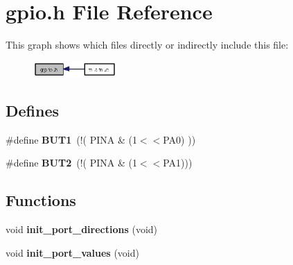 \section{gpio.h File Reference}
\label{gpio_8h}


This graph shows which files directly or indirectly include this file:\begin{figure}[H]
\begin{center}
\leavevmode
\includegraphics[width=90pt]{gpio_8h__dep__incl}
\end{center}
\end{figure}
\subsection*{Defines}
\begin{CompactItemize}
\item 
\#define {\bf BUT1}~(!( PINA \& (1$<$$<$PA0) ))
\item 
\#define {\bf BUT2}~(!( PINA \& (1$<$$<$PA1)))
\end{CompactItemize}
\subsection*{Functions}
\begin{CompactItemize}
\item 
void {\bf init\_\-port\_\-directions} (void)
\item 
void {\bf init\_\-port\_\-values} (void)
\end{CompactItemize}
